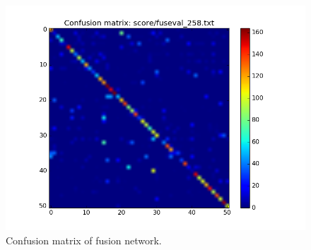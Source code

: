 \begin{figure}
	\centering
	\includegraphics[trim={2cm 1cm 2.5cm 1.5cm}, clip, width=\linewidth]{images/fus_t1_63_t5_85}
	\caption{Confusion matrix of fusion network.}
	\label{fig:fus_confusion}
\end{figure}